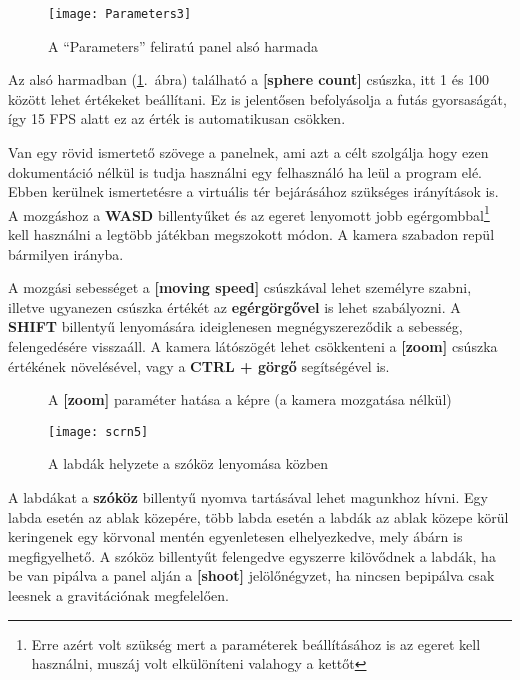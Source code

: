 \begin{figure}[H]
	\centering
	\texttt{[image: Parameters3]}
	\caption{A ``Parameters'' feliratú panel alsó harmada}
	\label{fig:Parameters3}
\end{figure}

Az alsó harmadban (\ref{fig:Parameters3}.~ábra) található a \textbf{[sphere count]} csúszka, itt 1 és 100 között lehet értékeket beállítani. Ez is jelentősen befolyásolja a futás gyorsaságát, így 15 FPS alatt ez az érték is automatikusan csökken.

Van egy rövid ismertető szövege a panelnek, ami azt a célt szolgálja hogy ezen dokumentáció nélkül is tudja használni egy felhasználó ha leül a program elé. Ebben kerülnek ismertetésre a virtuális tér bejárásához szükséges irányítások is. A mozgáshoz a \textbf{WASD} billentyűket és az egeret lenyomott jobb egérgombbal\footnote{Erre azért volt szükség mert a paraméterek beállításához is az egeret kell használni, muszáj volt elkülöníteni valahogy a kettőt} kell használni a legtöbb játékban megszokott módon. A kamera szabadon repül bármilyen irányba. 

A mozgási sebességet a \textbf{[moving speed]} csúszkával lehet személyre szabni, illetve ugyanezen csúszka értékét az \textbf{egérgörgővel} is lehet szabályozni. A \textbf{SHIFT} billentyű lenyomására ideiglenesen megnégyszereződik a sebesség, felengedésére visszaáll. A kamera látószögét lehet csökkenteni a \textbf{[zoom]} csúszka értékének növelésével, vagy a \textbf{CTRL + görgő} segítségével is.

\begin{figure}[H]
	\centering
	\hspace{1pt}
	\caption{A \textbf{[zoom]} paraméter hatása a képre (a kamera mozgatása nélkül)}
	\label{fig:zoom}
\end{figure}

\begin{figure}[H]
	\centering
	\texttt{[image: scrn5]}
	\caption{A labdák helyzete a szóköz lenyomása közben}
	\label{fig:home}
\end{figure}

A labdákat a \textbf{szóköz} billentyű nyomva tartásával lehet magunkhoz hívni. Egy labda esetén az ablak közepére, több labda esetén a labdák az ablak közepe körül keringenek egy körvonal mentén egyenletesen elhelyezkedve, mely  ábárn is megfigyelhető. A szóköz billentyűt felengedve egyszerre kilövődnek a labdák, ha be van pipálva a panel alján a \textbf{[shoot]} jelölőnégyzet, ha nincsen bepipálva csak leesnek a gravitációnak megfelelően.

